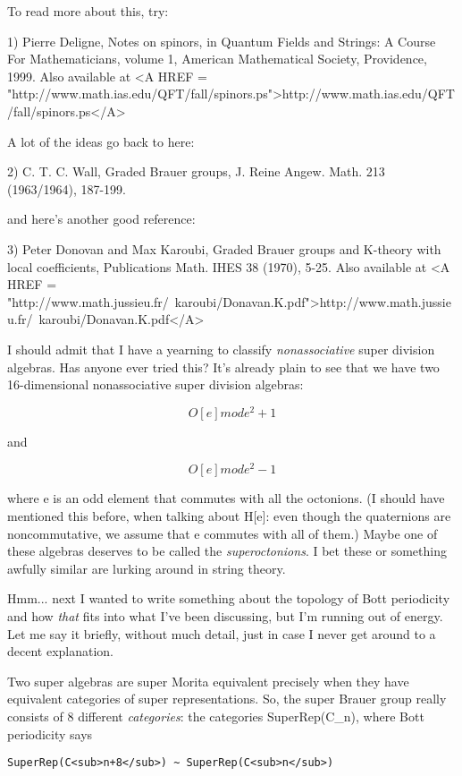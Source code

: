 To read more about this, try:

1) Pierre Deligne, Notes on spinors, in Quantum Fields and Strings: 
A Course For Mathematicians, volume 1, American Mathematical Society, 
Providence, 1999.  Also available at 
<A HREF = "http://www.math.ias.edu/QFT/fall/spinors.ps">http://www.math.ias.edu/QFT/fall/spinors.ps</A>

A lot of the ideas go back to here:

2) C. T. C. Wall, Graded Brauer groups, J. Reine Angew. Math. 213
(1963/1964), 187-199.

and here's another good reference:

3) Peter Donovan and Max Karoubi, Graded Brauer groups and K-theory
with local coefficients, Publications Math. IHES 38 (1970), 5-25.
Also available at 
<A HREF = "http://www.math.jussieu.fr/~karoubi/Donavan.K.pdf">http://www.math.jussieu.fr/~karoubi/Donavan.K.pdf</A>

I should admit that I have a yearning to classify \emph{nonassociative}
super division algebras.  Has anyone ever tried this?  It's already 
plain to see that we have two 16-dimensional nonassociative super 
division algebras:

$$
O[e] mod e^{2} + 1
$$
    
and

$$
O[e] mod e^{2} - 1
$$
    

where e is an odd element that commutes with all the octonions.
(I should have mentioned this before, when talking about H[e]:
even though the quaternions are noncommutative, we assume that
e commutes with all of them.)  Maybe one of these algebras 
deserves to be called the \emph{superoctonions}.  I bet these or 
something awfully similar are lurking around in string theory.  

Hmm... next I wanted to write something about the topology of Bott
periodicity and how \emph{that} fits into what I've been discussing,
but I'm running out of energy.  Let me say it briefly, without much
detail, just in case I never get around to a decent explanation.  

Two super algebras are super Morita equivalent precisely when
they have equivalent categories of super representations.  So,
the super Brauer group really consists of 8 different \emph{categories}:
the categories SuperRep(C_{n}), where Bott periodicity says

\begin{verbatim}
SuperRep(C<sub>n+8</sub>) ~ SuperRep(C<sub>n</sub>)
\end{verbatim}
    
